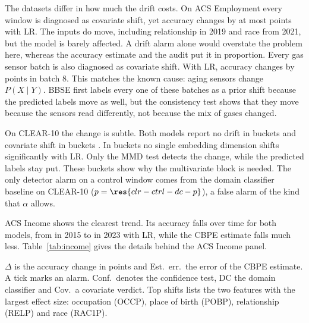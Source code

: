 \documentclass[10pt]{article}
\begin{document}
The datasets differ in how much the drift costs. On ACS Employment every window is diagnosed as covariate shift, yet accuracy changes by at most  points with LR. The inputs do move, including relationship in 2019 and race from 2021, but the model is barely affected. A drift alarm alone would overstate the problem here, whereas the accuracy estimate and the audit put it in proportion. Every gas sensor batch is also diagnosed as covariate shift. With LR, accuracy changes by  points in batch 8. This matches the known cause: aging sensors change $P(X\mid Y)$. BBSE first labels every one of these batches as a prior shift because the predicted labels move as well, but the consistency test shows that they move because the sensors read differently, not because the mix of gases changed.

On CLEAR-10 the change is subtle. Both models report no drift in buckets  and covariate shift in buckets . In buckets  no single embedding dimension shifts significantly with LR. Only the MMD test detects the change, while the predicted labels stay put. These buckets show why the multivariate block is needed. The only detector alarm on a control window comes from the domain classifier baseline on CLEAR-10 ($p=\res{clr-ctrl-dc-p}$), a false alarm of the kind that $\alpha$ allows.

ACS Income shows the clearest trend. Its accuracy falls over time for both models, from  in 2015 to  in 2023 with LR, while the CBPE estimate falls much less. Table~\ref{tab:income} gives the details behind the ACS Income panel.

\begin{table}[H]
\centering
\caption{Detection and diagnosis on the ACS Income windows}
\label{tab:income}

\end{table}

$\Delta$ is the accuracy change in points and Est.\ err.\ the error of the CBPE estimate. A tick marks an alarm. Conf.\ denotes the confidence test, DC the domain classifier and Cov.\ a covariate verdict. Top shifts lists the two features with the largest effect size: occupation (OCCP), place of birth (POBP), relationship (RELP) and race (RAC1P).
\end{document}
